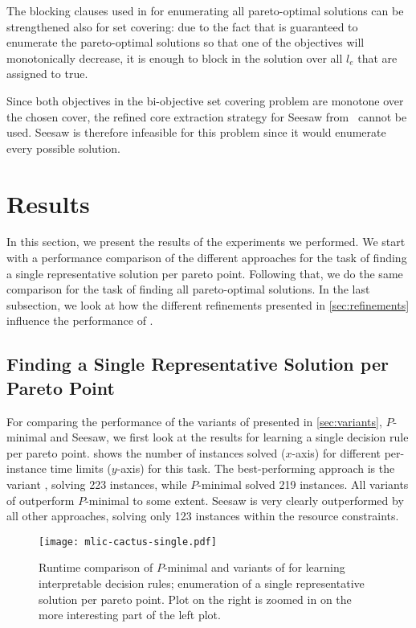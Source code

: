 The blocking clauses used in \algname{} for enumerating all pareto-optimal solutions can be strengthened also for set covering:
due to the fact that \algname{} is guaranteed to enumerate the pareto-optimal solutions so that one of the objectives will monotonically decrease, it is enough to block in \algname{} the solution over all $l_e$ that are assigned to true.

Since both objectives in the bi-objective set covering problem are monotone over the chosen cover, the refined core extraction strategy for Seesaw from~\textcite{DBLP:conf/cp/JanotaMSM21} cannot be used.
Seesaw is therefore infeasible for this problem since it would enumerate every possible solution.

\section{Results\label{sec:results}}

In this section, we present the results of the experiments we performed.
We start with a performance comparison of the different approaches for the task of finding a single representative solution per pareto point.
Following that, we do the same comparison for the task of finding all pareto-optimal solutions.
In the last subsection, we look at how the different refinements presented in \cref{sec:refinements} influence the performance of \algname{}.

\subsection{Finding a Single Representative Solution per Pareto Point}

For comparing the performance of the variants of \algname{} presented in \cref{sec:variants}, $P$-minimal and Seesaw, we first look at the results for learning a single decision rule per pareto point.
 shows the number of instances solved ($x$-axis) for different per-instance time limits ($y$-axis) for this task.
The best-performing approach is the \algname{} variant \msh{}, solving 223 instances, while $P$-minimal solved 219 instances.
All variants of \algname{} outperform $P$-minimal to some extent.
Seesaw is very clearly outperformed by all other approaches, solving only 123 instances within the resource constraints.

\begin{figure}
    \centering
    \texttt{[image: mlic-cactus-single.pdf]}
    \caption{Runtime comparison of $P$-minimal and variants of \algname{} for learning interpretable decision rules;
      enumeration of a single representative solution per pareto point.
      Plot on the right is zoomed in on the more interesting part of the left plot.
    }\label{fig:mlic-cactus-single}
\end{figure}

